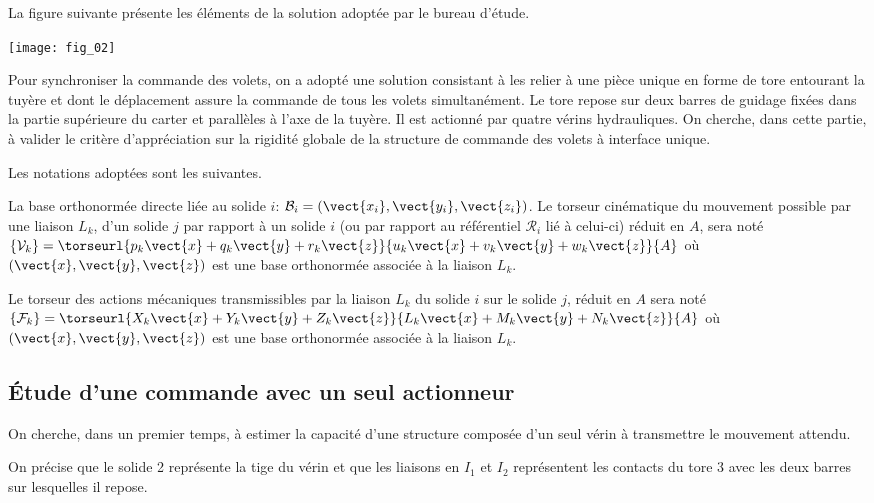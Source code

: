 \begin{multicols}{2}
La figure suivante présente les éléments de la solution adoptée par le bureau d'étude.
\begin{center}
\texttt{[image: fig\_02]}
\end{center}

Pour synchroniser la commande des volets, on a adopté une solution consistant à les relier à une pièce unique
en forme de tore entourant la tuyère et dont le déplacement assure la commande de tous les volets
simultanément. Le tore repose sur deux barres de guidage fixées dans la partie supérieure du carter et
parallèles à l'axe de la tuyère. Il est actionné par quatre vérins hydrauliques.
On cherche, dans cette partie, à valider le critère d'appréciation sur la rigidité globale de la structure de
commande des volets à interface unique.

Les notations adoptées sont les suivantes.

La base orthonormée directe liée au solide $i$: $\mathcal{B}_i = \left(\vect{x_i},\vect{y_i},\vect{z_i}\right)$. Le torseur cinématique du mouvement possible par une liaison $L_k$, d’un solide $j$ par rapport à un solide $i$
(ou par rapport au référentiel $\mathcal{R}_i$ lié à celui-ci) réduit en $A$, sera noté $\left\{ \mathcal{V}_k\right\}=\torseurl{p_k \vect{x}+q_k\vect{y}+r_k\vect{z}}{u_k \vect{x}+v_k\vect{y}+w_k\vect{z}}{A}$ où $\left(\vect{x},\vect{y},\vect{z}\right)$ est une base orthonormée associée à la liaison $L_k$. 

Le torseur des actions mécaniques transmissibles par la liaison $L_k$ du solide $i$ sur le solide $j$, réduit en $A$ sera noté $\left\{ \mathcal{F}_k\right\}=\torseurl{X_k \vect{x}+Y_k\vect{y}+Z_k\vect{z}}{L_k \vect{x}+M_k\vect{y}+N_k\vect{z}}{A}$ où $\left(\vect{x},\vect{y},\vect{z}\right)$ est une base orthonormée associée à la liaison $L_k$. 

\subsection*{Étude d'une commande avec un seul actionneur}

\begin{obj}
On cherche, dans un premier temps, à estimer la capacité d'une structure composée d'un seul vérin
à transmettre le mouvement attendu.
\end{obj}

On précise que le solide 2 représente la tige du vérin et que les liaisons en $I_1$ et $I_2$ représentent les contacts du
tore 3 avec les deux barres sur lesquelles il repose.


\end{multicols}
